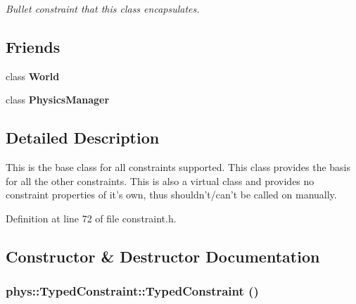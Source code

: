 \begin{DoxyCompactItemize}
\begin{DoxyCompactList}\small\item\em Bullet constraint that this class encapsulates. \item\end{DoxyCompactList}\end{DoxyCompactItemize}
\subsection*{Friends}
\begin{DoxyCompactItemize}
\item 
\hypertarget{classphys_1_1TypedConstraint_a7b4bcdf992c21ae83363f25df05b1d25}{
class {\bfseries World}}
\label{d1/d17/classphys_1_1TypedConstraint_a7b4bcdf992c21ae83363f25df05b1d25}

\item 
\hypertarget{classphys_1_1TypedConstraint_a139cf05ac01161b7071c8a037c841683}{
class {\bfseries PhysicsManager}}
\label{d1/d17/classphys_1_1TypedConstraint_a139cf05ac01161b7071c8a037c841683}

\end{DoxyCompactItemize}


\subsection{Detailed Description}
This is the base class for all constraints supported. This class provides the basis for all the other constraints. This is also a virtual class and provides no constraint properties of it's own, thus shouldn't/can't be called on manually. 

Definition at line 72 of file constraint.h.



\subsection{Constructor \& Destructor Documentation}
\hypertarget{classphys_1_1TypedConstraint_a499e2f94ca4ee111001efa0dd3862391}{
\subsubsection[{TypedConstraint}]{\setlength{\rightskip}{0pt plus 5cm}phys::TypedConstraint::TypedConstraint ()}}
\label{d1/d17/classphys_1_1TypedConstraint_a499e2f94ca4ee111001efa0dd3862391}


